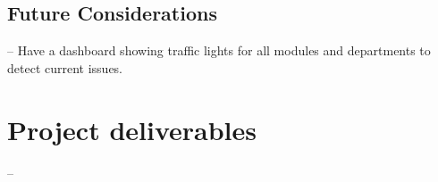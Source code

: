 \documentclass[11pt,fleqn,twoside]{article}
\begin{document}
\subsection{Future Considerations}
\begin{description}[itemsep=-0.25em,itemindent=-2em,leftmargin=4em]
	\item[Traffic Light Dashboard] -- Have a dashboard showing traffic lights for all modules and departments to detect current issues.
\end{description}



\section{Project deliverables}

\begin{description}[itemindent=-2em,leftmargin=4em]
	\item[] -- 
\end{description}

\nocite{*} %

{} 

%

\renewcommand{\refname}{Annotated Bibliography}  %
\end{document}
